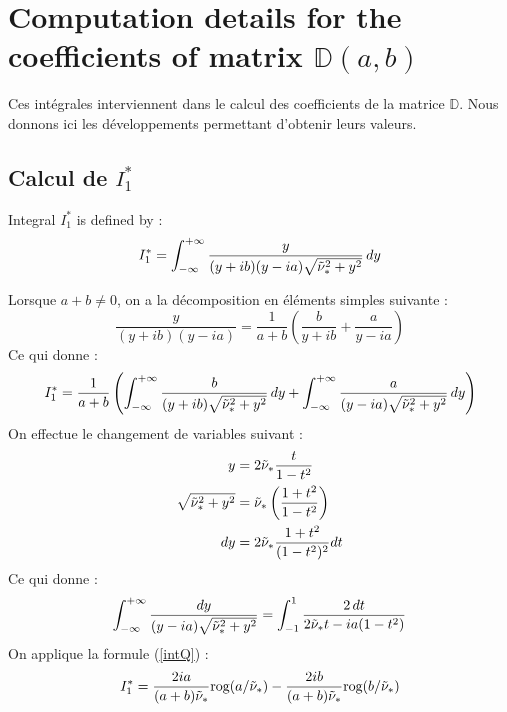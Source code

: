 \chapter{Computation details for the coefficients of matrix $\mathbb{D}(a,b)$}
\label{matD}
Ces intégrales interviennent dans le calcul des coefficients de la matrice $\mathbb{D}$. Nous donnons ici les développements permettant d'obtenir leurs valeurs.
\section{Calcul de $I_1^*$}
\label{calcI1}
Integral $I_1^*$ is defined by :
\begin{equation}
\label{defI1}
I_1^*=\int_{-\infty}^{+\infty} \frac{y}{(y+ib)(y-ia)\sqrt{\tilde{\nu}_*^2+y^2}}\,dy
\end{equation}

Lorsque $a+b \neq 0$, on a la décomposition en éléments simples suivante :
\begin{equation}
\frac{y}{(y+ib)(y-ia)}=\frac{1}{a+b} \left( \frac{b}{y+ib}+\frac{a}{y-ia} \right) 
\label{decomp2}
\end{equation}
Ce qui donne : 
\begin{equation}
I_1^*= \frac{1}{a+b} \left( \int_{-\infty}^{+\infty} \frac{b}{(y+ib)\sqrt{\tilde{\nu}_*^2+y^2}} \,dy +\int_{-\infty}^{+\infty} \frac{a}{(y-ia)\sqrt{\tilde{\nu}_*^2+y^2}} \,dy \right)
\end{equation}
On effectue le changement de variables suivant :
\begin{equation}
\begin{split}
 y&=2\tilde{\nu}_* \frac{t}{1-t^2} \\
\sqrt{\tilde{\nu}_*^2+y^2}&=\tilde{\nu}_*\left( \frac{1+t^2}{1-t^2} \right)  \\
 dy&= 2\tilde{\nu}_* \frac{1+t^2}{(1-t^2)^2}dt 
\end{split}
\label{changevar}
\end{equation}
Ce qui donne :
\begin{equation*}
\int_{-\infty}^{+\infty} \frac{dy}{(y-ia)\sqrt{\tilde{\nu}_*^2+y^2}}=\int_{-1}^1\frac{2\,dt}{2\tilde{\nu}_*t-ia(1-t^2)}
\end{equation*}
On applique la formule (\ref{intQ}) :
\begin{equation}
I_1^*=\frac{2ia}{(a+b)\tilde{\nu}_*}\mbox{rog}(a/\tilde{\nu}_*)-\frac{2ib}{(a+b)\tilde{\nu}_*}\mbox{rog}(b/\tilde{\nu}_*)
\label{valI1}
\end{equation}

